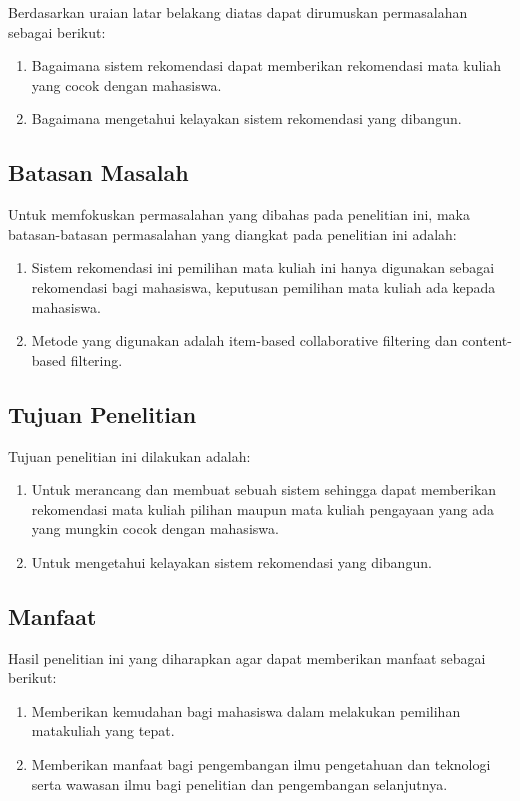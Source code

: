 Berdasarkan uraian latar belakang diatas dapat dirumuskan permasalahan sebagai berikut:
\begin{enumerate}
  \setlength\itemsep{0em}
  \item Bagaimana sistem rekomendasi dapat memberikan rekomendasi mata kuliah yang cocok dengan mahasiswa.
  \item Bagaimana mengetahui kelayakan sistem rekomendasi yang dibangun.
\end{enumerate}

\subsection{Batasan Masalah}

Untuk memfokuskan permasalahan yang dibahas pada penelitian ini, maka batasan-batasan permasalahan yang diangkat pada penelitian
ini adalah:
\begin{enumerate}
  \setlength\itemsep{0em}
  \item Sistem rekomendasi ini pemilihan mata kuliah
        ini hanya digunakan sebagai rekomendasi bagi
        mahasiswa, keputusan pemilihan mata kuliah
        ada kepada mahasiswa.
  \item Metode yang digunakan adalah item-based
        collaborative filtering dan content-based
        filtering.
\end{enumerate}

\subsection{Tujuan Penelitian}
Tujuan penelitian ini dilakukan adalah:
\begin{enumerate}
  \setlength\itemsep{0em}
  \item Untuk merancang dan membuat sebuah sistem sehingga dapat memberikan rekomendasi mata kuliah pilihan
        maupun mata kuliah pengayaan yang ada yang mungkin cocok dengan mahasiswa.
  \item Untuk
        mengetahui kelayakan sistem rekomendasi yang dibangun.
\end{enumerate}

\subsection{Manfaat}
Hasil penelitian ini yang diharapkan agar dapat memberikan manfaat sebagai berikut:
\begin{enumerate}
  \setlength\itemsep{0em}
  \item Memberikan kemudahan bagi mahasiswa dalam melakukan pemilihan matakuliah yang tepat.
  \item Memberikan manfaat bagi pengembangan ilmu pengetahuan dan teknologi serta wawasan ilmu bagi
        penelitian dan pengembangan selanjutnya.
\end{enumerate}